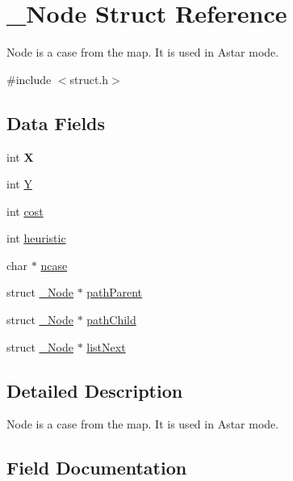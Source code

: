 \hypertarget{struct___node}{}\section{\+\_\+\+Node Struct Reference}
\label{struct___node}


Node is a case from the map. It is used in Astar mode.  




{\ttfamily \#include $<$struct.\+h$>$}

\subsection*{Data Fields}
\begin{DoxyCompactItemize}
\item 
int {\bfseries X}\hypertarget{struct___node_a80c0944640e62d3ed6c5419c1bcc0c88}{}\label{struct___node_a80c0944640e62d3ed6c5419c1bcc0c88}

\item 
int \hyperlink{struct___node_aa482c4cc86a24474e4fb19b5b5978778}{Y}
\item 
int \hyperlink{struct___node_a66700f11d42fee2413e58dbf49c43ee1}{cost}
\item 
int \hyperlink{struct___node_a266b59afb2a9e30cb84c2b14388fb5fe}{heuristic}
\item 
char $\ast$ \hyperlink{struct___node_aa0cc47f15f87b45c6960e18fd786f286}{ncase}
\item 
struct \hyperlink{struct___node}{\+\_\+\+Node} $\ast$ \hyperlink{struct___node_a7d0cf1a91c4dd335673a79aa5db87d01}{path\+Parent}
\item 
struct \hyperlink{struct___node}{\+\_\+\+Node} $\ast$ \hyperlink{struct___node_ac1bcf3cc6dca353ea81f1e92b01d7ecb}{path\+Child}
\item 
struct \hyperlink{struct___node}{\+\_\+\+Node} $\ast$ \hyperlink{struct___node_a92b940ae1bafab81f2c09dcb727b2759}{list\+Next}
\end{DoxyCompactItemize}


\subsection{Detailed Description}
Node is a case from the map. It is used in Astar mode. 

\subsection{Field Documentation}
